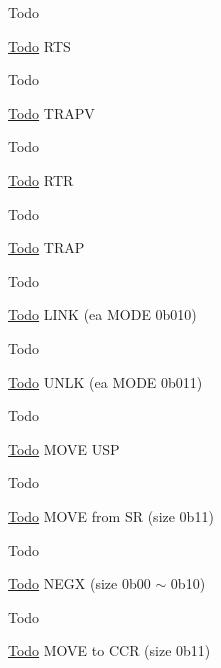 \begin{DoxyRefDesc}{Todo}
\item[\hyperlink{todo__todo000027}{Todo}]R\-T\-S \end{DoxyRefDesc}


\begin{DoxyRefDesc}{Todo}
\item[\hyperlink{todo__todo000028}{Todo}]T\-R\-A\-P\-V \end{DoxyRefDesc}


\begin{DoxyRefDesc}{Todo}
\item[\hyperlink{todo__todo000029}{Todo}]R\-T\-R \end{DoxyRefDesc}


\begin{DoxyRefDesc}{Todo}
\item[\hyperlink{todo__todo000030}{Todo}]T\-R\-A\-P \end{DoxyRefDesc}


\begin{DoxyRefDesc}{Todo}
\item[\hyperlink{todo__todo000031}{Todo}]L\-I\-N\-K (ea M\-O\-D\-E 0b010) \end{DoxyRefDesc}


\begin{DoxyRefDesc}{Todo}
\item[\hyperlink{todo__todo000032}{Todo}]U\-N\-L\-K (ea M\-O\-D\-E 0b011) \end{DoxyRefDesc}


\begin{DoxyRefDesc}{Todo}
\item[\hyperlink{todo__todo000033}{Todo}]M\-O\-V\-E U\-S\-P \end{DoxyRefDesc}


\begin{DoxyRefDesc}{Todo}
\item[\hyperlink{todo__todo000034}{Todo}]M\-O\-V\-E from S\-R (size 0b11) \end{DoxyRefDesc}


\begin{DoxyRefDesc}{Todo}
\item[\hyperlink{todo__todo000035}{Todo}]N\-E\-G\-X (size 0b00 $\sim$ 0b10) \end{DoxyRefDesc}


\begin{DoxyRefDesc}{Todo}
\item[\hyperlink{todo__todo000036}{Todo}]M\-O\-V\-E to C\-C\-R (size 0b11) \end{DoxyRefDesc}



